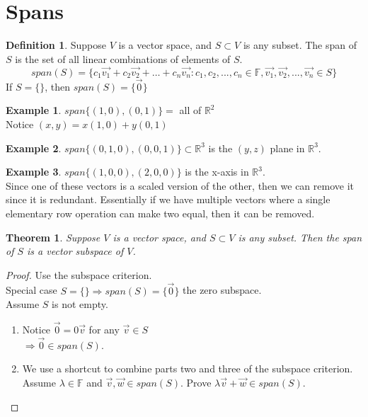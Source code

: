 \documentclass{report}
\theoremstyle{plain}
\newtheorem*{thrm}{Theorem}
\theoremstyle{definition}
\newtheorem*{ex}{Example}
\newtheorem*{defn}{Definition}
\theoremstyle{plain}
\begin{document}
\section{Spans}
\begin{defn}
Suppose $V$ is a vector space, and $S\subset V$ is any subset. The span of $S$ is the set of all linear combinations of elements of $S$.
\[ span(S) = \{ c_1\vec{v_1}+c_2\vec{v_2}+\dots+c_n\vec{v_n}: c_1,c_2,...,c_n \in \mathbb{F}, \vec{v_1},\vec{v_2},...,\vec{v_n} \in S \} \]
If $S=\{\}$, then $span(S)=\{\vec{0}\}$
\end{defn}
\begin{ex}
$span\{(1,0),(0,1)\} =$ all of $\mathbb{R}^2$\\
Notice $(x,y)=x(1,0)+y(0,1)$
\end{ex}
\begin{ex}
$span\{(0,1,0),(0,0,1)\} \subset \mathbb{R}^3$ is the $(y,z)$ plane in $\mathbb{R}^3$.
\end{ex}
\begin{ex}
$span\{(1,0,0),(2,0,0)\}$ is the x-axis in $\mathbb{R}^3$.\\
Since one of these vectors is a scaled version of the other, then we can remove it since it is redundant. Essentially if we have multiple vectors where a single elementary row operation can make two equal, then it can be removed. 
\end{ex}
\begin{thrm}
Suppose $V$ is a vector space, and $S \subset V$ is any subset. Then the span of $S$ is a vector subspace of $V$.
\end{thrm}
\begin{proof}
Use the subspace criterion.\\
Special case $S=\{\} \Rightarrow span(S)=\{\vec{0}\}$ the zero subspace.\\
Assume $S$ is not empty.
	\begin{enumerate}
	\item Notice $\vec{0} = 0\vec{v}$ for any $\vec{v} \in S$\\
	$\Rightarrow \vec{0} \in span(S)$.
	\item We use a shortcut to combine parts two and three of the subspace criterion.\\
	Assume $\lambda \in \mathbb{F}$ and $\vec{v},\vec{w} \in span(S)$. Prove $\lambda\vec{v}+\vec{w} \in span(S)$.
	\end{enumerate}
\end{proof}
\end{document}
